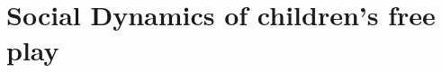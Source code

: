 \documentclass[compress]{beamer}
\begin{document}


\section[Free play]{Social Dynamics of children's free play}

%
%
%
%
%
%
%
%
%
%
%
\end{document}

